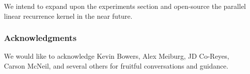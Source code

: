 \documentclass{article}
\begin{document}
We intend to expand upon the experiments section and open-source the parallel linear recurrence kernel in the near future.

\subsubsection*{Acknowledgments}
We would like to acknowledge Kevin Bowers, Alex Meiburg, JD Co-Reyes, Carson McNeil, and several others for fruitful conversations and guidance.
\end{document}
